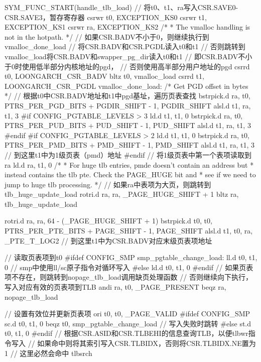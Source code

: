 \begin{CodeBlock}[language=BookLoongArch]
SYM_FUNC_START(handle_tlb_load)
    // 将t0、t1、ra写入CSR.SAVE0-CSR.SAVE3，暂存寄存器
    csrwr        t0, EXCEPTION_KS0
    csrwr        t1, EXCEPTION_KS1
    csrwr        ra, EXCEPTION_KS2
    /*
     * The vmalloc handling is not in the hotpath.
     */
    // 如果CSR.BADV不小于0，则继续执行到vmalloc_done_load
    // 将CSR.BADV和CSR.PGDL读入t0和t1
    // 否则跳转到vmalloc_load将CSR.BADV和swapper_pg_dir读入t0和t1
    // 即CSR.BADV不小于0时使用低半部分内核地址的pgd，
    // 否则使用高半部分用户地址的pgd
    csrrd        t0, LOONGARCH_CSR_BADV
    bltz        t0, vmalloc_load
    csrrd        t1, LOONGARCH_CSR_PGDL
vmalloc_done_load:
    /* Get PGD offset in bytes */
    // 根据t0中CSR.BADV地址和t1中pgd基址，遍历页表查找
    bstrpick.d    ra, t0, PTRS_PER_PGD_BITS + PGDIR_SHIFT - 1, PGDIR_SHIFT
    alsl.d        t1, ra, t1, 3
#if CONFIG_PGTABLE_LEVELS > 3
    ld.d        t1, t1, 0
    bstrpick.d    ra, t0, PTRS_PER_PUD_BITS + PUD_SHIFT - 1, PUD_SHIFT
    alsl.d        t1, ra, t1, 3
#endif
#if CONFIG_PGTABLE_LEVELS > 2
    ld.d        t1, t1, 0
    bstrpick.d    ra, t0, PTRS_PER_PMD_BITS + PMD_SHIFT - 1, PMD_SHIFT
    alsl.d        t1, ra, t1, 3
    // 到这里t1中为1级页表（pmd）地址
#endif
    // 将1级页表中第一个表项读取到ra
    ld.d        ra, t1, 0
    /*
     * For huge tlb entries, pmde doesn't contain an address but
     * instead contains the tlb pte. Check the PAGE_HUGE bit and
     * see if we need to jump to huge tlb processing.
     */
    // 如果ra中表项为大页，则跳转到tlb_huge_update_load
    rotri.d        ra, ra, _PAGE_HUGE_SHIFT + 1
    bltz        ra, tlb_huge_update_load

    rotri.d        ra, ra, 64 - (_PAGE_HUGE_SHIFT + 1)
    bstrpick.d    t0, t0, PTRS_PER_PTE_BITS + PAGE_SHIFT - 1, PAGE_SHIFT
    alsl.d        t1, t0, ra, _PTE_T_LOG2
    // 到这里t1中为CSR.BADV对应末级页表项地址

    // 读取页表项到t0
#ifdef CONFIG_SMP
smp_pgtable_change_load:
    ll.d        t0, t1, 0 // smp中使用ll/sc原子指令对循环写入
#else
    ld.d        t0, t1, 0
#endif
    // 如果页表项不存在，则跳转到nopage_tlb_load调用缺页处理函数
    // 否则继续向下执行，写入对应有效的页表项到TLB
    andi        ra, t0, _PAGE_PRESENT
    beqz        ra, nopage_tlb_load

    // 设置有效位并更新页表项
    ori        t0, t0, _PAGE_VALID
#ifdef CONFIG_SMP
    sc.d        t0, t1, 0
    beqz        t0, smp_pgtable_change_load // 写入失败时跳转
#else
    st.d        t0, t1, 0
#endif    
    // 根据CSR.ASID和CSR.TLBEHI的信息查询TLB，以便tlbwr指令写入
    // 如果命中则将其索引写入CSR.TLBIDX，否则将CSR.TLBIDX.NE置为1
    // 这里必然会命中
    tlbsrch


\end{CodeBlock}
